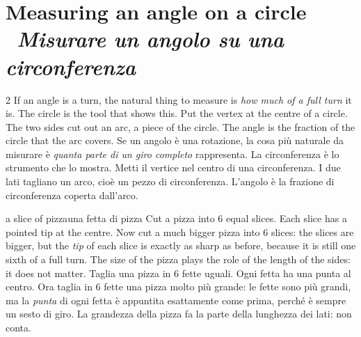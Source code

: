 \documentclass[10pt,a4paper,oneside]{book}
\newif\ifIT
\newenvironment{bi}%
  {\begin{paracol}{2}\global\ITfalse\selectlanguage{english}}%
  {\end{paracol}}
\newcommand{\IT}{\switchcolumn\global\ITtrue\selectlanguage{italian}}
\newcommand{\bisection}[2]{%
  \Needspace{7\baselineskip}%
  \section[#1 \textperiodcentered\ #2]{#1 {\color{itgreen}\itshape\,\textperiodcentered\ #2}}}
\begin{document}
\bisection{Measuring an angle on a circle}{Misurare un angolo su una circonferenza}\label{sec:circle}
\begin{bi}
If an angle is a turn, the natural thing to measure is \emph{how much of a full turn} it is. The circle is the tool that shows this. Put the vertex at the centre of a circle. The two sides cut out an arc, a piece of the circle. The angle is the fraction of the circle that the arc covers.
\IT
Se un angolo è una rotazione, la cosa più naturale da misurare è \emph{quanta parte di un giro completo} rappresenta. La circonferenza è lo strumento che lo mostra. Metti il vertice nel centro di una circonferenza. I due lati tagliano un arco, cioè un pezzo di circonferenza. L'angolo è la frazione di circonferenza coperta dall'arco.
\end{bi}

\begin{anchor}{a slice of pizza}{una fetta di pizza}
Cut a pizza into 6 equal slices. Each slice has a pointed tip at the centre. Now cut a much bigger pizza into 6 slices: the slices are bigger, but the \emph{tip} of each slice is exactly as sharp as before, because it is still one sixth of a full turn. The size of the pizza plays the role of the length of the sides: it does not matter.
\tcblower
Taglia una pizza in 6 fette uguali. Ogni fetta ha una punta al centro. Ora taglia in 6 fette una pizza molto più grande: le fette sono più grandi, ma la \emph{punta} di ogni fetta è appuntita esattamente come prima, perché è sempre un sesto di giro. La grandezza della pizza fa la parte della lunghezza dei lati: non conta.
\end{anchor}
\end{document}
